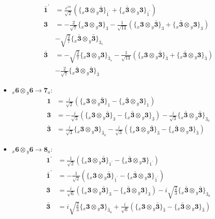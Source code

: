 \documentclass[english]{article}
\newcommand{\rep}[1]{\mathbf{#1}}
\newcommand{\repx}[2]{{}_{#2}\mathbf{#1}}
\newcommand{\subcg}[3]{\big\{ \repx{#1}{x}\otimes\repx{#2}{y}\big\}^{}_{#3}}
\begin{document}
\begin{itemize}
\begin{align*}
\\
\rep{\bar{1}^{\prime}} & = \frac{e^{i \alpha }}{\sqrt{2}}\left(\subcg{3}{\bar{3}}{\bar{1}^{\prime}}+\subcg{\bar{3}}{3}{\bar{1}^{\prime}}\right)
\\
\rep{3} & = -\frac{2}{\sqrt{7}}\subcg{3}{3}{3}-\frac{1}{\sqrt{14}}\left(\subcg{3}{\bar{3}}{3}+\subcg{\bar{3}}{3}{3}\right) \\ 
 & -\sqrt{\frac{2}{7}}\subcg{\bar{3}}{\bar{3}}{3_{s}}
\\
\rep{\bar{3}} & = -\sqrt{\frac{2}{7}}\subcg{3}{3}{\bar{3}_{s}}-\frac{1}{\sqrt{14}}\left(\subcg{3}{\bar{3}}{\bar{3}}+\subcg{\bar{3}}{3}{\bar{3}}\right) \\ 
 & -\frac{2}{\sqrt{7}}\subcg{\bar{3}}{\bar{3}}{\bar{3}}
\end{align*}
\item $\repx{6}{x}\otimes\repx{6}{y}\to\rep{7}_{a}$:
\begin{align*}
\rep{1} & = \frac{i}{\sqrt{2}}\left(\subcg{3}{\bar{3}}{1}-\subcg{\bar{3}}{3}{1}\right)
\\
\rep{3} & = -\frac{i}{\sqrt{3}}\left(\subcg{3}{\bar{3}}{3}-\subcg{\bar{3}}{3}{3}\right)-\frac{i}{\sqrt{3}}\subcg{\bar{3}}{\bar{3}}{3_{a}}
\\
\rep{\bar{3}} & = \frac{i}{\sqrt{3}}\subcg{3}{3}{\bar{3}_{a}}-\frac{i}{\sqrt{3}}\left(\subcg{3}{\bar{3}}{\bar{3}}-\subcg{\bar{3}}{3}{\bar{3}}\right)
\end{align*}
\item $\repx{6}{x}\otimes\repx{6}{y}\to\rep{8}_{a}$:
\begin{align*}
\rep{1^{\prime}} & = \frac{1}{\sqrt{2}}\left(\subcg{3}{\bar{3}}{1^{\prime}}-\subcg{\bar{3}}{3}{1^{\prime}}\right)
\\
\rep{\bar{1}^{\prime}} & = -\frac{1}{\sqrt{2}}\left(\subcg{3}{\bar{3}}{\bar{1}^{\prime}}-\subcg{\bar{3}}{3}{\bar{1}^{\prime}}\right)
\\
\rep{3} & = \frac{i}{\sqrt{6}}\left(\subcg{3}{\bar{3}}{3}-\subcg{\bar{3}}{3}{3}\right)-i \sqrt{\frac{2}{3}}\subcg{\bar{3}}{\bar{3}}{3_{a}}
\\
\rep{\bar{3}} & = i \sqrt{\frac{2}{3}}\subcg{3}{3}{\bar{3}_{a}}+\frac{i}{\sqrt{6}}\left(\subcg{3}{\bar{3}}{\bar{3}}-\subcg{\bar{3}}{3}{\bar{3}}\right)
\end{align*}
\end{itemize}
\end{document}
